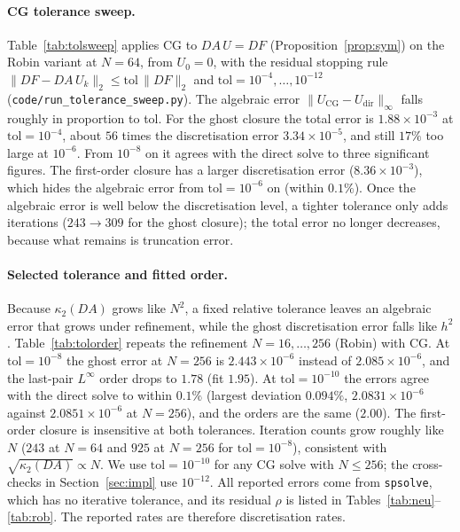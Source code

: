 \documentclass[11pt,a4paper]{article}
\theoremstyle{palplain}
\theoremstyle{paldef}
\theoremstyle{palremark}
\begin{document}
\paragraph{CG tolerance sweep.} Table~\ref{tab:tolsweep} applies CG to $DA\,U=DF$
(Proposition~\ref{prop:sym}) on the Robin variant at $N=64$, from $U_0=0$, with the residual
stopping rule $\|DF-DA\,U_k\|_2\le\mathrm{tol}\,\|DF\|_2$ and
$\mathrm{tol}=10^{-4},\dots,10^{-12}$ (\texttt{code/run\_tolerance\_sweep.py}). The algebraic
error $\|U_{\mathrm{CG}}-U_{\mathrm{dir}}\|_\infty$ falls roughly in proportion to tol. For the
ghost closure the total error is $1.88\times10^{-3}$ at $\mathrm{tol}=10^{-4}$, about $56$ times
the discretisation error $3.34\times10^{-5}$, and still $17\%$ too large at $10^{-6}$. From
$10^{-8}$ on it agrees with the direct solve to three significant figures. The first-order
closure has a larger discretisation error ($8.36\times10^{-3}$), which hides the algebraic
error from $\mathrm{tol}=10^{-6}$ on (within $0.1\%$). Once the algebraic error is well below the
discretisation level, a tighter tolerance only adds iterations ($243\to309$ for the ghost
closure); the total error no longer decreases, because what remains is truncation error.

\begin{table}[H]\centering\footnotesize

\caption{CG tolerance sweep on $DA\,U=DF$, Robin variant ($\beta=2$), $N=64$, $U_0=0$.
$\rho$: scaled residual \eqref{eq:sres} of the CG iterate in the unscaled system $AU=F$. The
last row of each block is the direct \texttt{spsolve} on the same mesh.
Source: \texttt{results/tolerance\_sweep.csv}.}
\label{tab:tolsweep}
\end{table}

\paragraph{Selected tolerance and fitted order.} Because $\kappa_2(DA)$ grows like $N^2$, a fixed
relative tolerance leaves an algebraic error that grows under refinement, while the ghost
discretisation error falls like $h^2$. Table~\ref{tab:tolorder} repeats the refinement
$N=16,\dots,256$ (Robin) with CG. At $\mathrm{tol}=10^{-8}$ the ghost error at $N=256$ is
$2.443\times10^{-6}$ instead of $2.085\times10^{-6}$, and the last-pair $L^\infty$ order drops to
$1.78$ (fit $1.95$). At $\mathrm{tol}=10^{-10}$ the errors agree with the direct solve to within
$0.1\%$ (largest deviation $0.094\%$, $2.0831\times10^{-6}$ against $2.0851\times10^{-6}$ at
$N=256$), and the orders are the same ($2.00$). The first-order closure is insensitive at both tolerances. Iteration
counts grow roughly like $N$ ($243$ at $N=64$ and $925$ at $N=256$ for $\mathrm{tol}=10^{-8}$),
consistent with $\sqrt{\kappa_2(DA)}\propto N$. We use $\mathrm{tol}=10^{-10}$ for any CG solve
with $N\le256$; the cross-checks in Section~\ref{sec:impl} use $10^{-12}$. All reported errors
come from \texttt{spsolve}, which has no iterative tolerance, and its residual $\rho$ is listed
in Tables~\ref{tab:neu}--\ref{tab:rob}. The reported rates are therefore discretisation rates.
\end{document}
